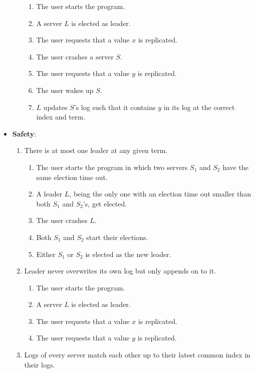 \begin{itemize}
\begin{enumerate}
\begin{enumerate}
        \item The user starts the program.
        \item A server $L$ is elected as leader.
        \item The user requests that a value $x$ is replicated.
        \item The user crashes a server $S$.
        \item The user requests that a value $y$ is replicated.
        \item The user wakes up $S$.
        \item $L$ updates $S$'s log such that it contains $y$ in its log at the correct index and term.
        \end{enumerate}
    \end{enumerate}
\item \textbf{Safety}:
    \begin{enumerate}
    \item There is at most one leader at any given term.
        \begin{enumerate}
        \item The user starts the program in which two servers $S_1$ and $S_2$ have the same election time out.
        \item A leader $L$, being the only one with an election time out smaller than both $S_1$ and $S_2$'s, get elected.
        \item The user crashes $L$.
        \item Both $S_1$ and $S_2$ start their elections.
        \item Either $S_1$ or $S_2$ is elected as the new leader.
        \end{enumerate}
    \item Leader never overwrites its own log but only appends on to it.
        \begin{enumerate}
        \item The user starts the program.
        \item A server $L$ is elected as leader.
        \item The user requests that a value $x$ is replicated.
        \item The user requests that a value $y$ is replicated.%
        \end{enumerate}
    \item Logs of every server match each other up to their latest common index in their logs.
        \begin{enumerate}

\end{enumerate}
\end{enumerate}
\end{itemize}
